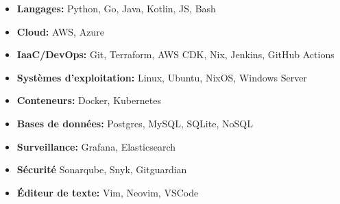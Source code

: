 \begin{itemize}[leftmargin=1.2em, itemsep=2pt]
	\item \textbf{Langages:} Python, Go, Java, Kotlin, JS, Bash
	\item \textbf{Cloud:} AWS, Azure
	\item \textbf{IaaC/DevOps:} Git, Terraform, AWS CDK, Nix, Jenkins, GitHub Actions
	\item \textbf{Systèmes d'exploitation:} Linux, Ubuntu, NixOS, Windows Server
	\item \textbf{Conteneurs:} Docker, Kubernetes
	\item \textbf{Bases de données:} Postgres, MySQL, SQLite, NoSQL
	\item \textbf{Surveillance:} Grafana, Elasticsearch
	\item \textbf{Sécurité} Sonarqube, Snyk, Gitguardian
	\item \textbf{Éditeur de texte:} Vim, Neovim, VSCode
\end{itemize}
